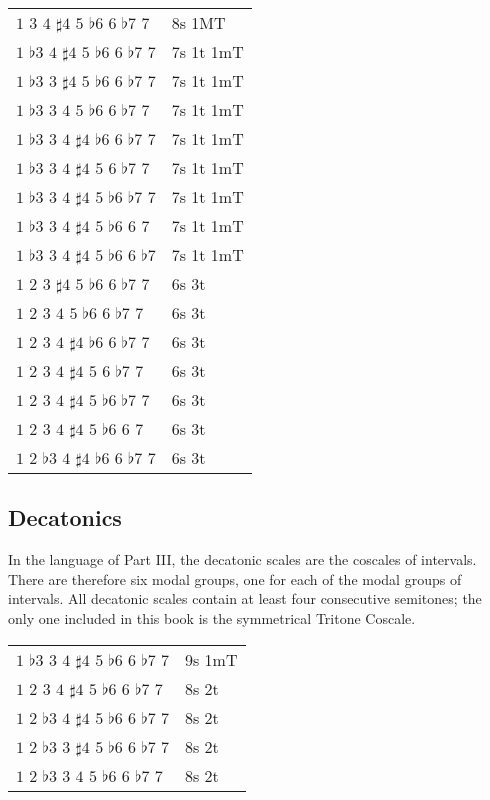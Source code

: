 \documentclass[english]{./gbook}
\begin{document}
\begin{large}
\begin{tabular}{ll}
    $1$ $3$ $4$ $\sharp4$ $5$ $\flat6$ $6$ $\flat7$ $7$   &   8s 1MT      \\
    $1$ $\flat3$ $4$ $\sharp4$ $5$ $\flat6$ $6$ $\flat7$ $7$   &   7s 1t 1mT      \\
    $1$ $\flat3$ $3$ $\sharp4$ $5$ $\flat6$ $6$ $\flat7$ $7$   &   7s 1t 1mT      \\
    $1$ $\flat3$ $3$ $4$ $5$ $\flat6$ $6$ $\flat7$ $7$   &   7s 1t 1mT      \\
    $1$ $\flat3$ $3$ $4$ $\sharp4$ $\flat6$ $6$ $\flat7$ $7$   &   7s 1t 1mT      \\
    $1$ $\flat3$ $3$ $4$ $\sharp4$ $5$ $6$ $\flat7$ $7$   &   7s 1t 1mT      \\
    $1$ $\flat3$ $3$ $4$ $\sharp4$ $5$ $\flat6$ $\flat7$ $7$   &   7s 1t 1mT      \\
    $1$ $\flat3$ $3$ $4$ $\sharp4$ $5$ $\flat6$ $6$ $7$   &   7s 1t 1mT      \\
    $1$ $\flat3$ $3$ $4$ $\sharp4$ $5$ $\flat6$ $6$ $\flat7$   &   7s 1t 1mT      \\
    $1$ $2$ $3$ $\sharp4$ $5$ $\flat6$ $6$ $\flat7$ $7$   &   6s 3t      \\
    $1$ $2$ $3$ $4$ $5$ $\flat6$ $6$ $\flat7$ $7$   &   6s 3t      \\
    $1$ $2$ $3$ $4$ $\sharp4$ $\flat6$ $6$ $\flat7$ $7$   &   6s 3t      \\
    $1$ $2$ $3$ $4$ $\sharp4$ $5$ $6$ $\flat7$ $7$   &   6s 3t      \\
    $1$ $2$ $3$ $4$ $\sharp4$ $5$ $\flat6$ $\flat7$ $7$   &   6s 3t      \\
    $1$ $2$ $3$ $4$ $\sharp4$ $5$ $\flat6$ $6$ $7$   &   6s 3t      \\
    $1$ $2$ $\flat3$ $4$ $\sharp4$ $\flat6$ $6$ $\flat7$ $7$   &   6s 3t 
\end{tabular}


\subsection*{Decatonics}

In the language of Part III, the decatonic scales are the coscales of intervals. There are therefore six modal groups, one for each of the modal groups of intervals. All decatonic scales contain at least four consecutive semitones; the only one included in this book is the symmetrical Tritone Coscale.

\begin{tabular}{ll}
    $1$ $\flat3$ $3$ $4$ $\sharp4$ $5$ $\flat6$ $6$ $\flat7$ $7$   &   9s 1mT      \\
    $1$ $2$ $3$ $4$ $\sharp4$ $5$ $\flat6$ $6$ $\flat7$ $7$   &   8s 2t      \\
    $1$ $2$ $\flat3$ $4$ $\sharp4$ $5$ $\flat6$ $6$ $\flat7$ $7$   &   8s 2t      \\
    $1$ $2$ $\flat3$ $3$ $\sharp4$ $5$ $\flat6$ $6$ $\flat7$ $7$   &   8s 2t      \\
    $1$ $2$ $\flat3$ $3$ $4$ $5$ $\flat6$ $6$ $\flat7$ $7$   &   8s 2t      
\end{tabular}



\end{large}
\end{document}
